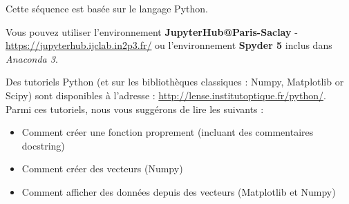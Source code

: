 Cette séquence est basée sur le langage Python.

Vous pouvez utiliser l'environnement \textbf{JupyterHub@Paris-Saclay} - 
\href{https://jupyterhub.ijclab.in2p3.fr/}{https://jupyterhub.ijclab.in2p3.fr/} ou l'environnement \textbf{Spyder 5} inclus dans \textit{Anaconda 3}.

Des tutoriels Python (et sur les bibliothèques classiques : Numpy, Matplotlib or Scipy) sont disponibles à l'adresse : \href{http://lense.institutoptique.fr/python/}{http://lense.institutoptique.fr/python/}. Parmi ces tutoriels, nous vous suggérons de lire les suivants :

\begin{itemize}
	\item Comment créer une fonction proprement (incluant des commentaires docstring)
	\item Comment créer des vecteurs (Numpy)
	\item Comment afficher des données depuis des vecteurs (Matplotlib et Numpy)
\end{itemize}
